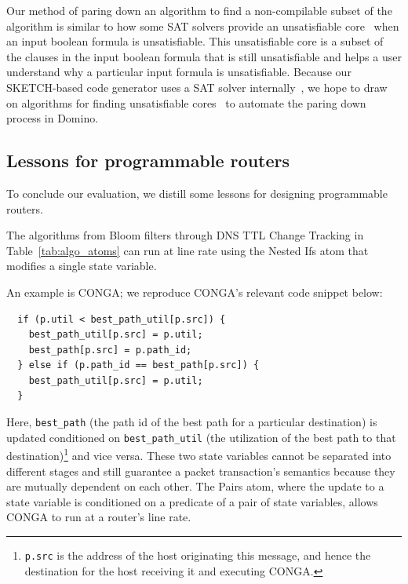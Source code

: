 Our method of paring down an algorithm to find a non-compilable subset of the
algorithm is similar to how some SAT solvers provide an unsatisfiable
core~\cite{unsat_core} when an input boolean formula is unsatisfiable. This
unsatisfiable core is a subset of the clauses in the input boolean formula that
is still unsatisfiable and helps a user understand why a particular input
formula is unsatisfiable. Because our SKETCH-based code generator uses a SAT
solver internally~\cite{sketch_asplos}, we hope to draw on algorithms for
finding unsatisfiable cores~\cite{unsat_core} to automate the paring down
process in Domino.

\subsection{Lessons for programmable routers}
\label{ss:lessons}

To conclude our evaluation, we distill some lessons for designing programmable
routers.

 The algorithms from Bloom filters through DNS TTL Change Tracking
in Table~\ref{tab:algo_atoms} can run at line rate using the Nested Ifs atom
that modifies a single state variable.

An example is CONGA; we reproduce CONGA's relevant code snippet below:
\begin{verbatim}
  if (p.util < best_path_util[p.src]) {
    best_path_util[p.src] = p.util;
    best_path[p.src] = p.path_id;
  } else if (p.path_id == best_path[p.src]) {
    best_path_util[p.src] = p.util;
  }
\end{verbatim}
Here, \texttt{best\_path} (the path id of the best path for a particular
destination) is updated conditioned on \texttt{best\_path\_util} (the
utilization of the best path to that destination)\footnote{{\tt p.src} is the
address of the host originating this message, and hence the destination for the
host receiving it and executing CONGA.} and vice versa. These two state
variables cannot be separated into different stages and still guarantee a
packet transaction's semantics because they are mutually dependent on each
other.  The Pairs atom, where the update to a state variable is conditioned on
a predicate of a pair of state variables, allows CONGA to run at a router's line rate.

